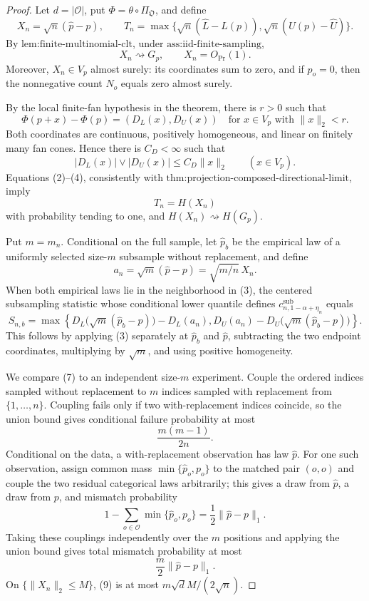 \documentclass{article}
\begin{document}
\begin{proof}
Let \(d=|\mathcal O|\), put \(\Phi=\theta\circ\Pi_{\mathfrak O}\), and define
\[
X_n=\sqrt n(\widehat p-p),
\qquad
T_n=\max\{\sqrt n(\widehat L-L(p)),\sqrt n(U(p)-\widehat U)\}.
\tag{1}
\]
By \(\text{lem:finite-multinomial-clt}\), under \(\text{ass:iid-finite-sampling}\),
\[
X_n\rightsquigarrow G_p,
\qquad
X_n=O_{\Pr}(1).
\tag{2}
\]
Moreover, \(X_n\in V_p\) almost surely: its coordinates sum to zero, and if \(p_o=0\), then the nonnegative count \(N_o\) equals zero almost surely.

By the local finite-fan hypothesis in the theorem, there is \(r>0\) such that
\[
\Phi(p+x)-\Phi(p)=(D_L(x),D_U(x))
\quad\text{for }x\in V_p\text{ with }\|x\|_2<r.
\tag{3}
\]
Both coordinates are continuous, positively homogeneous, and linear on finitely many fan cones. Hence there is \(C_D<\infty\) such that
\[
|D_L(x)|\vee|D_U(x)|\leq C_D\|x\|_2
\qquad(x\in V_p).
\tag{4}
\]
Equations (2)--(4), consistently with \(\text{thm:projection-composed-directional-limit}\), imply
\[
T_n=H(X_n)
\tag{5}
\]
with probability tending to one, and \(H(X_n)\rightsquigarrow H(G_p)\).

Put \(m=m_n\). Conditional on the full sample, let \(\widehat p_b\) be the empirical law of a uniformly selected size-\(m\) subsample without replacement, and define
\[
a_n=\sqrt m(\widehat p-p)=\sqrt{m/n}\,X_n.
\tag{6}
\]
When both empirical laws lie in the neighborhood in (3), the centered subsampling statistic whose conditional lower quantile defines \(c^{\mathrm{sub}}_{n,1-\alpha+\eta_n}\) equals
\[
S_{n,b}=\max\left\{
D_L\bigl(\sqrt m(\widehat p_b-p)\bigr)-D_L(a_n),
D_U(a_n)-D_U\bigl(\sqrt m(\widehat p_b-p)\bigr)
\right\}.
\tag{7}
\]
This follows by applying (3) separately at \(\widehat p_b\) and \(\widehat p\), subtracting the two endpoint coordinates, multiplying by \(\sqrt m\), and using positive homogeneity.

We compare (7) to an independent size-\(m\) experiment. Couple the ordered indices sampled without replacement to \(m\) indices sampled with replacement from \(\{1,\ldots,n\}\). Coupling fails only if two with-replacement indices coincide, so the union bound gives conditional failure probability at most
\[
\frac{m(m-1)}{2n}.
\tag{8}
\]
Conditional on the data, a with-replacement observation has law \(\widehat p\). For one such observation, assign common mass \(\min\{\widehat p_o,p_o\}\) to the matched pair \((o,o)\) and couple the two residual categorical laws arbitrarily; this gives a draw from \(\widehat p\), a draw from \(p\), and mismatch probability
\[
1-\sum_{o\in\mathcal O}\min\{\widehat p_o,p_o\}
=\frac12\|\widehat p-p\|_1.
\]
Taking these couplings independently over the \(m\) positions and applying the union bound gives total mismatch probability at most
\[
\frac m2\|\widehat p-p\|_1.
\tag{9}
\]
On \(\{\|X_n\|_2\leq M\}\), (9) is at most \(m\sqrt d M/(2\sqrt n)\).


\end{proof}
\end{document}
